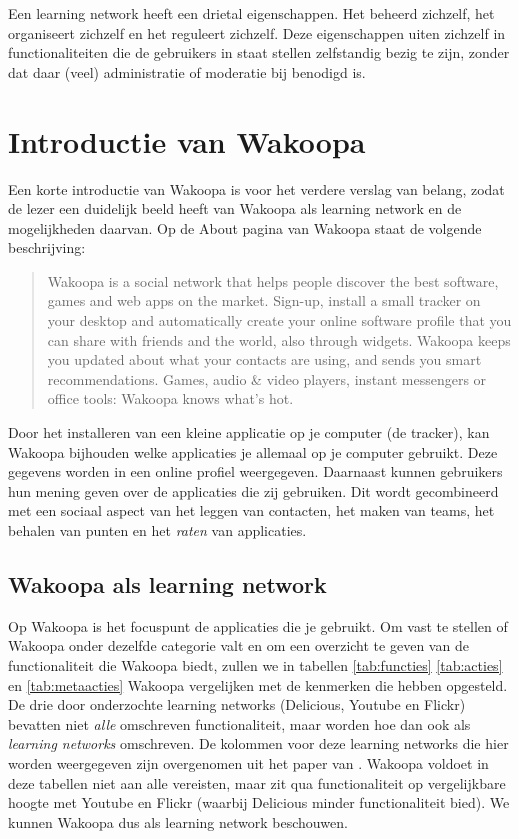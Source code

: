 \documentclass[a4paper, 10pt, pdftex]{report}
\begin{document}
            Een learning network heeft een drietal eigenschappen. Het beheerd zichzelf, het organiseert zichzelf en het reguleert zichzelf. Deze eigenschappen uiten zichzelf in functionaliteiten die de gebruikers in staat stellen zelfstandig bezig te zijn, zonder dat daar (veel) administratie of moderatie bij benodigd is.

    \section{Introductie van Wakoopa}
      Een korte introductie van Wakoopa is voor het verdere verslag van belang, zodat de lezer een duidelijk beeld heeft van Wakoopa als learning network en de mogelijkheden daarvan. Op de About pagina van Wakoopa \citep{Gaal2007} staat de volgende beschrijving:
        \begin{quote} Wakoopa is a social network that helps people discover the best software, games and web apps on the market. Sign-up, install a small tracker on your desktop and automatically create your online software profile that you can share with friends and the world, also through widgets. Wakoopa keeps you updated about what your contacts are using, and sends you smart recommendations. Games, audio \& video players, instant messengers or office tools: Wakoopa knows what's hot.
        \end{quote}
      Door het installeren van een kleine applicatie op je computer (de tracker), kan Wakoopa bijhouden welke applicaties je allemaal op je computer gebruikt. Deze gegevens worden in een online profiel weergegeven. Daarnaast kunnen gebruikers hun mening geven over de applicaties die zij gebruiken. Dit wordt gecombineerd met een sociaal aspect van het leggen van contacten, het maken van teams, het behalen van punten en het \emph{raten} van applicaties.

        \subsection{Wakoopa als learning network}
        Op Wakoopa is het focuspunt de applicaties die je gebruikt. Om vast te stellen of Wakoopa onder dezelfde categorie valt en om een overzicht te geven van de functionaliteit die Wakoopa biedt, zullen we in tabellen \ref{tab:functies} \ref{tab:acties} en \ref{tab:metaacties} \label{learningnetwork} Wakoopa vergelijken met de kenmerken die \citeauthor{Berlanga2007} hebben opgesteld.
         De drie door \citeauthor{Berlanga2007}  onderzochte learning networks (Delicious, Youtube en Flickr) bevatten niet \emph{alle} omschreven functionaliteit, maar worden hoe dan ook als \emph{learning networks} omschreven. De kolommen voor deze learning networks die hier worden weergegeven zijn overgenomen uit het paper van \citeauthor{Berlanga2007}. Wakoopa voldoet in deze tabellen niet aan alle vereisten, maar zit qua functionaliteit op vergelijkbare hoogte met Youtube en Flickr (waarbij Delicious minder functionaliteit bied). We kunnen Wakoopa dus als learning network beschouwen.
\end{document}
